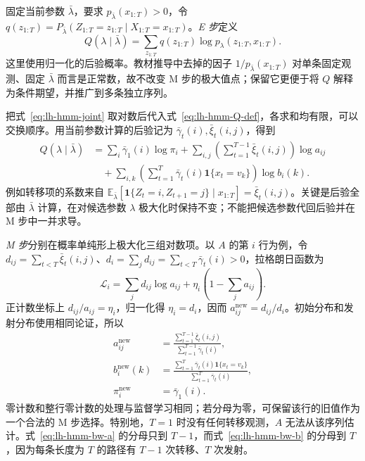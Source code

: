 固定当前参数 $\bar\lambda$，要求 $p_{\bar\lambda}(x_{1:T})>0$，令 $q(z_{1:T})=P_{\bar\lambda}(Z_{1:T}=z_{1:T}\mid X_{1:T}=x_{1:T})$。\emph{E 步}定义
\begin{equation}
\label{eq:lh-hmm-Q-def}
 Q(\lambda\mid\bar\lambda)
 =\sum_{z_{1:T}}q(z_{1:T})\log p_\lambda(z_{1:T},x_{1:T}).
\end{equation}
这里使用归一化的后验概率。教材推导中去掉的因子 $1/p_{\bar\lambda}(x_{1:T})$ 对单条固定观测、固定 $\bar\lambda$ 而言是正常数，故不改变 M 步的极大值点；保留它更便于将 $Q$ 解释为条件期望，并推广到多条独立序列。

把式~\eqref{eq:lh-hmm-joint} 取对数后代入式~\eqref{eq:lh-hmm-Q-def}，各求和均有限，可以交换顺序。用当前参数计算的后验记为 $\bar\gamma_t(i),\bar\xi_t(i,j)$，得到
\begin{equation}
\label{eq:lh-hmm-Q-expanded}
 \begin{aligned}
 Q(\lambda\mid\bar\lambda)
 &=\sum_i\bar\gamma_1(i)\log\pi_i
 +\sum_{i,j}\left(\sum_{t=1}^{T-1}\bar\xi_t(i,j)\right)\log a_{ij}\\
 &\quad+\sum_{i,k}\left(\sum_{t=1}^T\bar\gamma_t(i)\mathbf1\{x_t=v_k\}\right)\log b_i(k).
 \end{aligned}
\end{equation}
例如转移项的系数来自 $\mathbb E_{\bar\lambda}[\mathbf1\{Z_t=i,Z_{t+1}=j\}\mid x_{1:T}]=\bar\xi_t(i,j)$。关键是后验全部由 $\bar\lambda$ 计算，在对候选参数 $\lambda$ 极大化时保持不变；不能把候选参数代回后验并在 M 步中一并求导。

\emph{M 步}分别在概率单纯形上极大化三组对数项。以 $A$ 的第 $i$ 行为例，令 $d_{ij}=\sum_{t<T}\bar\xi_t(i,j)$、$d_i=\sum_jd_{ij}=\sum_{t<T}\bar\gamma_t(i)>0$，拉格朗日函数为
\[
 \mathcal L_i=\sum_jd_{ij}\log a_{ij}+\eta_i\left(1-\sum_j a_{ij}\right).
\]
正计数坐标上 $d_{ij}/a_{ij}=\eta_i$，归一化得 $\eta_i=d_i$，因而 $a_{ij}^{\mathrm{new}}=d_{ij}/d_i$。初始分布和发射分布使用相同论证，所以
\begin{align}
\label{eq:lh-hmm-bw-a}
 a_{ij}^{\mathrm{new}}&=\frac{\sum_{t=1}^{T-1}\bar\xi_t(i,j)}{\sum_{t=1}^{T-1}\bar\gamma_t(i)},\\
\label{eq:lh-hmm-bw-b}
 b_i^{\mathrm{new}}(k)&=\frac{\sum_{t=1}^T\bar\gamma_t(i)\mathbf1\{x_t=v_k\}}{\sum_{t=1}^T\bar\gamma_t(i)},\\
\label{eq:lh-hmm-bw-pi}
 \pi_i^{\mathrm{new}}&=\bar\gamma_1(i).
\end{align}
零计数和整行零计数的处理与监督学习相同；若分母为零，可保留该行的旧值作为一个合法的 M 步选择。特别地，$T=1$ 时没有任何转移观测，$A$ 无法从该序列估计。式~\eqref{eq:lh-hmm-bw-a} 的分母只到 $T-1$，而式~\eqref{eq:lh-hmm-bw-b} 的分母到 $T$，因为每条长度为 $T$ 的路径有 $T-1$ 次转移、$T$ 次发射。


